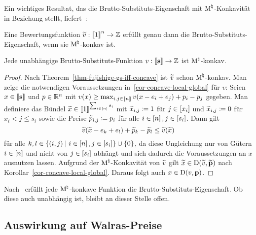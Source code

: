 Ein wichtiges Resultat, das die Brutto-Substituts-Eigenschaft mit $\textrm{\textup{M}}^\natural$-Konkavität in Beziehung stellt, liefert~\cite[Theorem 2.1]{Fujishige2003}:

\begin{theorem}\label{thm-fujishige-gs-iff-concave}
	Eine Bewertungsfunktion $\widetilde{v}:\left\llbracket 1 \right\rrbracket^n\rightarrow \mathbb{Z}$ erfüllt genau dann die Brutto-Substituts-Eigenschaft, wenn sie $\textrm{\textup{M}}^\natural$-konkav ist.
\end{theorem}
\begin{korollar}
	Jede unabhängige Brutto-Substituts-Funktion $v:\left\llbracket \mathbf{s} \right\rrbracket \rightarrow \mathbb{Z}$ ist $\textrm{\textup{M}}^\natural$-konkav.
\end{korollar}
\begin{proof}
	Nach Theorem~\ref{thm-fujishige-gs-iff-concave} ist $\widetilde{v}$ schon $\textrm{\textup{M}}^\natural$-konkav.
	Man zeige die notwendigen Voraussetzungen in~\ref{cor-concave-local-global} für $v$:
	Seien $x\in\left\llbracket \mathbf{s} \right\rrbracket$ und $p\in\mathbb{R}^n$ mit $v(x)\geq \max_{i,j\in\left\llbracket n \right\rrbracket} v(x - e_i + e_j) + p_i - p_j$ gegeben.
	Man definiere das Bündel $\widetilde{x}\in\left\llbracket 1 \right\rrbracket^{\sum_{i\in\left[ n \right]} s_i}$ mit $\widetilde{x}_{i,j} \coloneqq 1$ für $j\in\left[ x_i \right]$ und $\widetilde{x}_{i,j} \coloneqq 0$ für $x_i < j \leq s_i$ sowie die Preise $\widetilde{p}_{i,j}\coloneqq p_i$ für alle $i\in\left[ n \right],j\in\left[ s_i \right]$.
	Dann
	gilt \[
	\widetilde{v}(\widetilde{x} - e_k + e_l) + \widetilde{p}_k - \widetilde{p}_l \leq \widetilde{v}(\widetilde{x})
	\] für alle $k, l \in \{ (i,j) \mid i\in\left[ n \right], j\in\left[ s_i \right] \}\cup\{ 0 \}$, da diese Ungleichung nur von Gütern $i\in\left[ n \right]$ und nicht von $j\in\left[ s_i \right]$ abhängt und sich dadurch die Voraussetzungen an $x$ ausnutzen lassen.
	Aufgrund der $\textrm{\textup{M}}^\natural$-Konkavität von $\widetilde{v}$ gilt $\widetilde{x}\in\operatorname{D}(\widetilde{v}, \widetilde{\mathbf{p}})$ nach Korollar~\ref{cor-concave-local-global}. Daraus folgt auch $x\in\operatorname{D}(v,\mathbf{p})$.
\end{proof}
\begin{bemerkung}
	Nach~\cite[Theorem~11.4]{Murota2003} erfüllt jede $\textrm{\textup{M}}^\natural$-konkave Funktion die Brutto-Substituts-Eigenschaft.
	Ob diese auch unabhängig ist, bleibt an dieser Stelle offen.
\end{bemerkung}

\subsection{Auswirkung auf Walras-Preise}